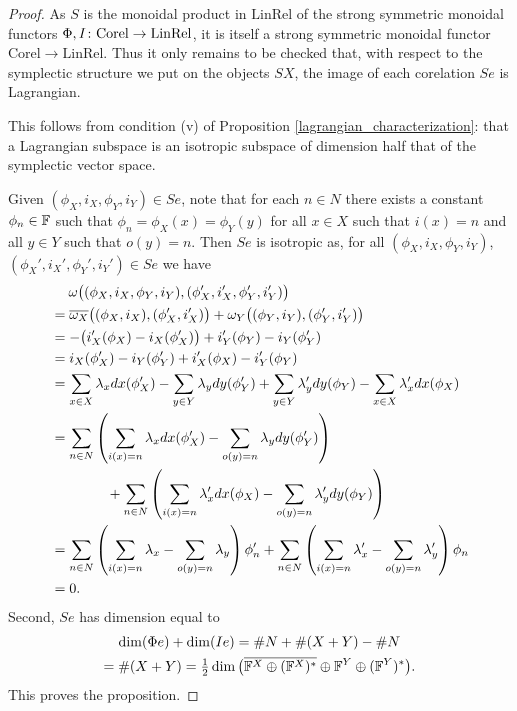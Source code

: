\begin{proof}
  As $S$ is the monoidal product in $\mathrm{LinRel}$ of the strong symmetric
  monoidal functors $\Phi, I{\colon} \mathrm{Corel} \to \mathrm{LinRel}$, it is
  itself a strong symmetric monoidal functor $\mathrm{Corel} \to
  \mathrm{LinRel}$. Thus it only remains to be checked that, with respect to the
  symplectic structure we put on the objects $SX$, the image of each
  corelation $Se$ is Lagrangian. 

  
  This follows from condition (v) of Proposition
  \ref{lagrangian_characterization}: that a Lagrangian subspace is an isotropic
  subspace of dimension half that of the symplectic vector space.

  Given $(\phi_X,i_X,\phi_Y,i_Y) \in Se$, note that for each $n \in N$ there
  exists a constant $\phi_n \in {\mathbb F}$ such that $\phi_n=\phi_X(x) = \phi_Y(y)$ for
  all $x \in X$ such that $i(x) = n$ and all $y \in Y$ such that $o(y)= n$. 
  Then $Se$ is isotropic as, for all 
  $(\phi_X,i_X,\phi_Y,i_Y)$, $(\phi_X',i_X',\phi_Y',i_Y') \in Se$ we have
  \begin{align*}
    &\phantom{=} \enskip
    \omega\big((\phi_X,i_X,\phi_Y,i_Y),(\phi_X',i_X',\phi_Y',i_Y')\big)
    \\
    &= \overline{\omega_X}\big((\phi_X,i_X),(\phi_X',i_X')\big) +
    \omega_Y\big((\phi_Y,i_Y),(\phi_Y',i_Y')\big) \\
    &= -\big(i_X'(\phi_X)-i_X(\phi_X')\big) + i_Y'(\phi_Y)-i_Y(\phi_Y') \\
    &= i_X(\phi_X')-i_Y(\phi_Y') + i_X'(\phi_X)-i_Y'(\phi_Y) \\
    &= \sum_{x \in X} \lambda_x dx(\phi_X') - \sum_{y \in Y} \lambda_y dy(\phi_Y') +
    \sum_{y \in Y} \lambda_y' dy(\phi_Y) - \sum_{x \in X} \lambda_x' dx(\phi_X)\\
    &= \sum_{n \in N}\left(\sum_{i(x)=n} \lambda_x dx(\phi_X') -
    \sum_{o(y)=n} \lambda_y dy(\phi_Y')\right) \\
    &\qquad \qquad+ \sum_{n \in N}\left(\sum_{i(x)=n} \lambda_x'dx(\phi_X) -
    \sum_{o(y)=n} \lambda_y' dy(\phi_Y)\right)\\
    &= \sum_{n \in N}\left(\sum_{i(x)=n} \lambda_x - \sum_{o(y)=n} \lambda_y
    \right)\phi'_n + \sum_{n \in N}\left(\sum_{i(x)=n} \lambda_x'- \sum_{o(y)=n}
    \lambda_y'\right)\phi_n\\
    &= 0.
  \end{align*}
  Second, $Se$ has dimension equal to 
  \begin{multline*}
    \dim(\Phi e)+ \dim(Ie) = \#N+\#(X+Y) - \#N \\
    = \#(X+Y) = \tfrac12
    \dim\big(\overline{{\mathbb F}^X \oplus ({\mathbb F}^X)^\ast} \oplus {\mathbb F}^Y \oplus
    ({\mathbb F}^Y)^\ast\big).
  \end{multline*}
  This proves the proposition.
\end{proof}

